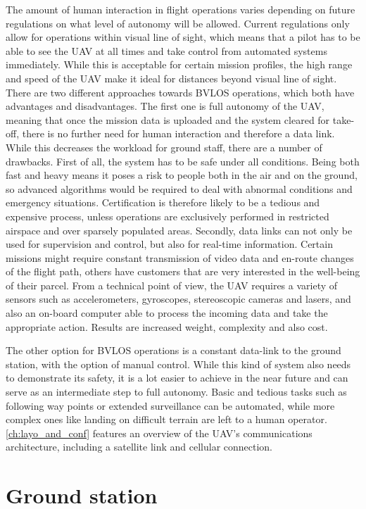 The amount of human interaction in flight operations varies depending on future regulations on what level of autonomy will be allowed. Current regulations only allow for operations within visual line of sight, which means that a pilot has to be able to see the UAV at all times and take control from automated systems immediately. While this is acceptable for certain mission profiles, the high range and speed of the UAV make it ideal for distances beyond visual line of sight. There are two different approaches towards BVLOS operations, which both have advantages and disadvantages. The first one is full autonomy of the UAV, meaning that once the mission data is uploaded and the system cleared for take-off, there is no further need for human interaction and therefore a data link. While this decreases the workload for ground staff, there are a number of drawbacks. First of all, the system has to be safe under all conditions. Being both fast and heavy means it poses a risk to people both in the air and on the ground, so advanced algorithms would be required to deal with abnormal conditions and emergency situations. Certification is therefore likely to be a tedious and expensive process, unless operations are exclusively performed in restricted airspace and over sparsely populated areas. Secondly, data links can not only be used for supervision and control, but also for real-time information. Certain missions might require constant transmission of video data and en-route changes of the flight path, others have customers that are very interested in the well-being of their parcel. From a technical point of view, the UAV requires a variety of sensors such as accelerometers, gyroscopes, stereoscopic cameras and lasers, and also an on-board computer able to process the incoming data and take the appropriate action. Results are increased weight, complexity and also cost.

The other option for BVLOS operations is a constant data-link to the ground station, with the option of manual control. While this kind of system also needs to demonstrate its safety, it is a lot easier to achieve in the near future and can serve as an intermediate step to full autonomy. Basic and tedious tasks such as following way points or extended surveillance can be automated, while more complex ones like landing on difficult terrain are left to a human operator. \autoref{ch:layo_and_conf} features an overview of the UAV's communications architecture, including a satellite link and cellular connection.

\section{Ground station}

